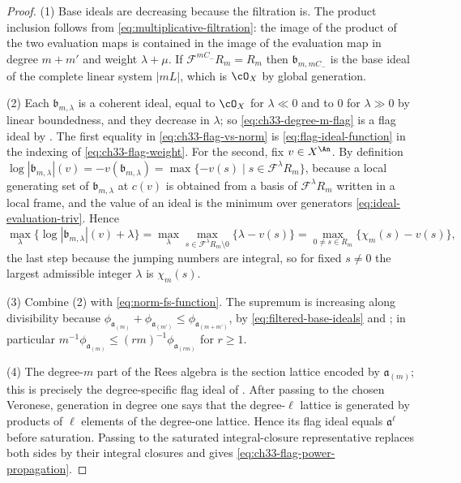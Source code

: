 \begin{proof}
(1)  Base ideals are decreasing because the filtration is.  The product
inclusion follows from \eqref{eq:multiplicative-filtration}: the image of
the product of the two evaluation maps is contained in the image of the
evaluation map in degree $m+m'$ and weight $\lambda+\mu$.  If
$\mathcal F^{mC_-}R_m=R_m$ then $\mathfrak b_{m,mC_-}$ is the base ideal
of the complete linear system $|mL|$, which is $\cO_X$ by global
generation.

(2)  Each $\mathfrak b_{m,\lambda}$ is a coherent ideal, equal to
$\cO_X$ for $\lambda\ll0$ and to $0$ for $\lambda\gg0$ by linear
boundedness, and they decrease in $\lambda$; so
\eqref{eq:ch33-degree-m-flag} is a flag ideal by
.  The first equality in
\eqref{eq:ch33-flag-vs-norm} is \eqref{eq:flag-ideal-function} in the
indexing of \eqref{eq:ch33-flag-weight}.  For the second, fix
$v\in X^{\An}$.  By definition
$\log|\mathfrak b_{m,\lambda}|(v)=-v(\mathfrak b_{m,\lambda})
=\max\{-v(s)\mid s\in\mathcal F^\lambda R_m\}$, because a local generating
set of $\mathfrak b_{m,\lambda}$ at $c(v)$ is obtained from a basis of
$\mathcal F^\lambda R_m$ written in a local frame, and the value of an
ideal is the minimum over generators
\eqref{eq:ideal-evaluation-triv}.  Hence
\[
 \max_\lambda\{\log|\mathfrak b_{m,\lambda}|(v)+\lambda\}
 =\max_\lambda\max_{s\in\mathcal F^\lambda R_m\setminus0}
          \{\lambda-v(s)\}
 =\max_{0\ne s\in R_m}\{\chi_m(s)-v(s)\},
\]
the last step because the jumping numbers are integral, so for fixed
$s\ne0$ the largest admissible integer $\lambda$ is $\chi_m(s)$.

(3)  Combine (2) with \eqref{eq:norm-fs-function}.  The supremum is
increasing along divisibility because
$\phi_{\mathfrak a_{(m)}}+\phi_{\mathfrak a_{(m')}}
\leq\phi_{\mathfrak a_{(m+m')}}$, by \eqref{eq:filtered-base-ideals} and
; in particular
$m^{-1}\phi_{\mathfrak a_{(m)}}\leq
(rm)^{-1}\phi_{\mathfrak a_{(rm)}}$ for $r\geq1$.

(4)  The degree-$m$ part of the Rees algebra is the section lattice
encoded by $\mathfrak a_{(m)}$; this is precisely the degree-specific
flag ideal of \cite[Definition~2.19 and Proposition~2.21]{BHJ17}.  After
passing to the chosen Veronese, generation in degree one says that the
degree-$\ell$ lattice is generated by products of $\ell$ elements of
the degree-one lattice.  Hence its flag ideal equals
$\mathfrak a^\ell$ before saturation.  Passing to the saturated
integral-closure representative replaces both sides by their integral
closures and gives \eqref{eq:ch33-flag-power-propagation}.
\end{proof}


